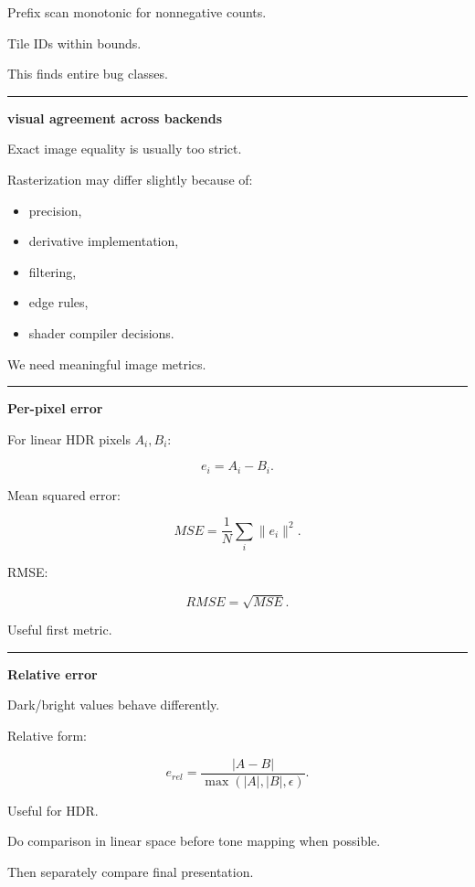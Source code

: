 Prefix scan monotonic for nonnegative counts.

Tile IDs within bounds.

This finds entire bug classes.

\begin{center}\rule{0.5\linewidth}{0.5pt}\end{center}

\textbf{visual agreement across backends}

Exact image equality is usually too strict.

Rasterization may differ slightly because of:

\begin{itemize}
\tightlist
\item
  precision,
\item
  derivative implementation,
\item
  filtering,
\item
  edge rules,
\item
  shader compiler decisions.
\end{itemize}

We need meaningful image metrics.

\begin{center}\rule{0.5\linewidth}{0.5pt}\end{center}

\textbf{Per-pixel error}

For linear HDR pixels \(A_i,B_i\):

\[
e_i=A_i-B_i.
\]

Mean squared error:

\[
MSE=
\frac1N
\sum_i
\|e_i\|^2.
\]

RMSE:

\[
\boxed{
RMSE=
\sqrt{MSE}.
}
\]

Useful first metric.

\begin{center}\rule{0.5\linewidth}{0.5pt}\end{center}

\textbf{Relative error}

Dark/bright values behave differently.

Relative form:

\[
e_{rel}
=
\frac{
|A-B|
}{
\max(|A|,|B|,\epsilon)
}.
\]

Useful for HDR.

Do comparison in linear space before tone mapping when possible.

Then separately compare final presentation.

